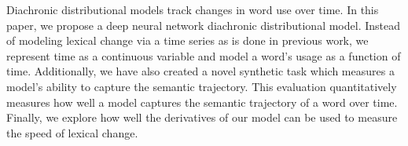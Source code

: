 Diachronic distributional models track changes in word use over time. In this paper, we propose a deep neural network diachronic distributional model. Instead of modeling lexical change via a time series as is done in previous work, we represent time as a continuous variable and model a word's usage as a function of time. Additionally, we have also created a novel synthetic task which measures a model's ability to capture the semantic trajectory. This evaluation quantitatively measures how well a model captures the semantic trajectory of a word over time. Finally, we explore how well the derivatives of our model can be used to measure the speed of lexical change.

